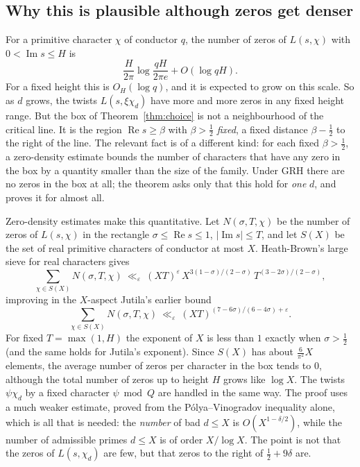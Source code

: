 \documentclass[11pt]{amsart}
\numberwithin{equation}{section}
\theoremstyle{definition}
\theoremstyle{remark}
\newcommand{\re}{\operatorname{Re}}
\newcommand{\im}{\operatorname{Im}}
\begin{document}
\subsection*{Why this is plausible although zeros get denser}
For a primitive character $\chi$ of conductor $q$, the number of zeros of $L(s,\chi)$ with $0<\im s\le H$ is {\cite[Ch.~16]{Davenport}}
\begin{equation}
 \frac H{2\pi}\log\frac{qH}{2\pi e}+O(\log qH).
\end{equation}
 For a fixed height this is $O_H(\log q)$, and it is expected to grow on this scale. So as $d$ grows, the twists $L(s,\xi\chi_d)$ have more and more zeros in any fixed height range. But the box of Theorem~\ref{thm:choice} is not a neighbourhood of the critical line. It is the region $\re s\ge\beta$ with $\beta>\frac12$ \emph{fixed}, a fixed distance $\beta-\frac12$ to the right of the line. The relevant fact is of a different kind: for each fixed $\beta>\frac12$, a zero-density estimate bounds the number of characters that have any zero in the box by a quantity smaller than the size of the family. Under GRH there are no zeros in the box at all; the theorem asks only that this hold for \emph{one} $d$, and proves it for almost all.

Zero-density estimates make this quantitative. Let $N(\sigma,T,\chi)$ be the number of zeros of $L(s,\chi)$ in the rectangle $\sigma\le\re s\le1$, $|\im s|\le T$, and let $S(X)$ be the set of real primitive characters of conductor at most $X$. Heath-Brown's large sieve for real characters gives {\cite[Theorem~3]{HB}}
\begin{equation}
 \sum_{\chi\in S(X)}N(\sigma,T,\chi)\ \ll_\varepsilon\ (XT)^{\varepsilon}\,X^{3(1-\sigma)/(2-\sigma)}\,T^{(3-2\sigma)/(2-\sigma)},
\end{equation}
improving in the $X$-aspect Jutila's earlier bound \cite{jutila}
\begin{equation}
 \sum_{\chi\in S(X)}N(\sigma,T,\chi)\ \ll_\varepsilon\ (XT)^{(7-6\sigma)/(6-4\sigma)+\varepsilon}.
\end{equation}
 For fixed $T=\max(1,H)$ the exponent of $X$ is less than $1$ exactly when $\sigma>\frac12$ (and the same holds for Jutila's exponent). Since $S(X)$ has about $\frac6{\pi^2}X$ elements, the average number of zeros per character in the box tends to $0$, although the total number of zeros up to height $H$ grows like $\log X$. The twists $\psi\chi_d$ by a fixed character $\psi\bmod Q$ are handled in the same way. The proof uses a much weaker estimate, proved from the P\'olya--Vinogradov inequality alone, which is all that is needed: the \emph{number} of bad $d\le X$ is $O(X^{1-\delta/2})$, while the number of admissible primes $d\le X$ is of order $X/\log X$. The point is not that the zeros of $L(s,\chi_d)$ are few, but that zeros to the right of $\frac12+9\delta$ are.
\end{document}
